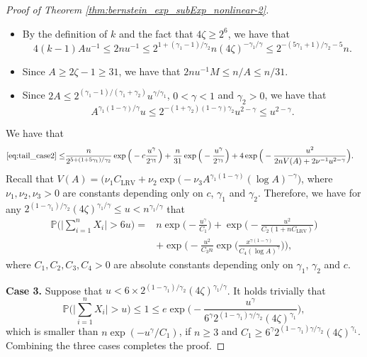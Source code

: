 \documentclass[11pt]{article}
\theoremstyle{plain}
\theoremstyle{definition}
\begin{document}
\begin{proof}[Proof of Theorem \ref{thm:bernstein_exp_subExp_nonlinear-2}]
\begin{itemize}
    \item By the definition of $k$ and the fact that $4\zeta \geq 2^6$, we have that 
    \begin{equation*}
        4(k-1)Au^{-1} \leq 2nu^{-1} \leq 2^{1+(\gamma_1-1)/\gamma_2}n(4\zeta)^{-\gamma_1/\gamma} \leq 2^{-(5\gamma_1+1)/\gamma_2-5}n.
    \end{equation*}
    \item Since $A \geq 2\zeta - 1 \geq 31$, we have that $2nu^{-1}M \leq n/A \leq n/31$.
    \item Since $2A \leq 2^{(\gamma_1-1)/(\gamma_1+\gamma_2)}u^{\gamma/\gamma_1}$, $0 < \gamma < 1$ and $\gamma_2 > 0$, we have that 
    \begin{equation*}
        A^{\gamma_1(1-\gamma)/\gamma}u \leq 2^{-(1+\gamma_2)(1-\gamma)\gamma_2}u^{2-\gamma} \leq u^{2-\gamma}.
    \end{equation*}
\end{itemize}
We have that
\begin{equation*}
\begin{aligned}
    \eqref{eq:tail_case2} \leq& \frac{n}{2^{5+(1+5\gamma_1)/\gamma_2}}\exp\Big(-c\frac{u^{\gamma}}{2^{\gamma_1}}\Big) + \frac{n}{31}\exp\Big(-\frac{u^{\gamma}}{2^{\gamma_1}}\Big)+ 4\exp\Big( -\frac{u^2}{2nV(A) + 2\nu^{-1}u^{2-\gamma}} \Big).
\end{aligned}
\end{equation*}
Recall that $V(A) = (\nu_1C_{\mathrm{LRV}} + \nu_2\exp\big(-\nu_3A^{\gamma_1(1-\gamma)}(\log A)^{-\gamma}\big)$, where $\nu_1, \nu_2, \nu_3 > 0$ are constants depending only on $c$, $\gamma_1$ and $\gamma_2$. Therefore, we have for any $2^{(1-\gamma_1)/\gamma_2}(4\zeta)^{\gamma_1/\gamma} \leq u < n^{\gamma_1/\gamma}$ that
\begin{equation*}
\begin{aligned}
    \mathbb{P}\Big( \Big|\sum_{i = 1}^nX_i\Big| > 6u \Big) =& n\exp\Big(-\frac{u^{\gamma}}{C_1}\Big) + \exp\Big( -\frac{u^2}{C_2(1+nC_{\mathrm{LRV}})} \Big)\\
    &+ \exp\Big( -\frac{u^2}{C_3n}\exp\Big(\frac{x^{\gamma(1-\gamma)}}{C_4(\log A)^{\gamma}} \Big) \Big),
\end{aligned}
\end{equation*}
where $C_1, C_2, C_3, C_4 > 0$ are absolute constants depending only on $\gamma_1$, $\gamma_2$ and $c$.

\textbf{Case 3.} Suppose that $u < 6\times2^{(1-\gamma_1)/\gamma_2}(4\zeta)^{\gamma_1/\gamma}$. It holds trivially that
\begin{equation*}
    \mathbb{P}\Big( \Big|\sum_{i = 1}^nX_i\Big| > u \Big) \leq 1 \leq e\exp\Big(-\frac{u^{\gamma}}{6^{\gamma}2^{(1-\gamma_1)\gamma/\gamma_2}(4\zeta)^{\gamma_1}}\Big),
\end{equation*}
which is smaller than $n\exp(-u^{\gamma}/C_1)$, if $n \geq 3$ and $C_1 \geq 6^{\gamma}2^{(1-\gamma_1)\gamma/\gamma_2}(4\zeta)^{\gamma_1}$. Combining the three cases completes the proof.
\end{proof}
\end{document}
